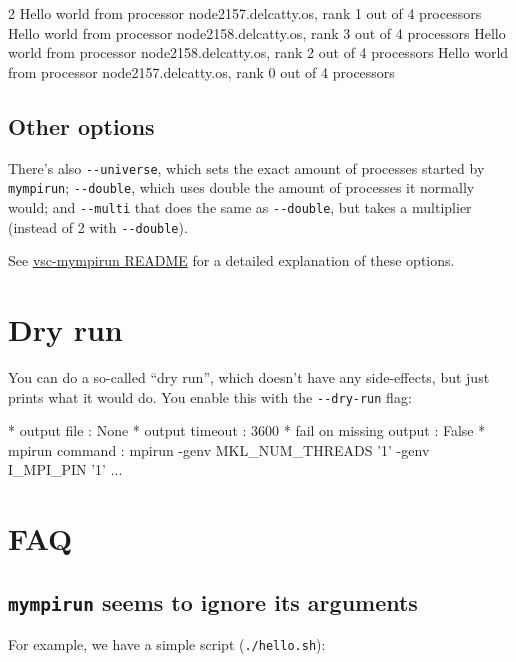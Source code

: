 \begin{prompt}
2
Hello world from processor node2157.delcatty.os, rank 1 out of 4 processors
Hello world from processor node2158.delcatty.os, rank 3 out of 4 processors
Hello world from processor node2158.delcatty.os, rank 2 out of 4 processors
Hello world from processor node2157.delcatty.os, rank 0 out of 4 processors
\end{prompt}

\subsection{Other options}

There's also \lstinline|--universe|, which sets the exact amount of processes started by \lstinline|mympirun|;
\lstinline|--double|, which uses double the amount of processes it normally would;
and \lstinline|--multi| that does the same as \lstinline|--double|, but takes a multiplier
(instead of 2 with \lstinline|--double|).

See \href{https://github.com/hpcugent/vsc-mympirun/blob/master/README.md}{vsc-mympirun README}
for a detailed explanation of these options.

\section{Dry run}

You can do a so-called ``dry run'', which doesn't have any side-effects, but just
prints what it would do. You enable this with the \lstinline|--dry-run| flag:

\begin{prompt}
* output file            : None
* output timeout         : 3600
* fail on missing output : False
* mpirun command         : mpirun -genv MKL_NUM_THREADS '1' -genv I_MPI_PIN '1' ...
\end{prompt}

\section{FAQ}

\subsection{\texttt{mympirun} seems to ignore its arguments}

For example, we have a simple script (\lstinline|./hello.sh|):

